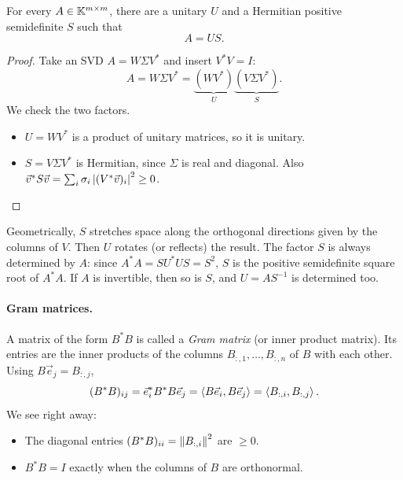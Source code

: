\begin{theorem}
  \label{thm:polar}
  For every $A \in \mathbb{K}^{m \times m}$, there are a unitary $U$ and a Hermitian positive semidefinite $S$ such that
  \begin{equation}
    A = US.
  \end{equation}
\end{theorem}

\begin{proof}
  Take an SVD $A = W\Sigma V^\ast$ and insert $V^\ast V = I$:
  \begin{equation}
    A = W\Sigma V^\ast = \underbrace{(WV^\ast)}_{U}\underbrace{(V\Sigma V^\ast)}_{S}.
  \end{equation}
  We check the two factors.
  \begin{itemize}
    \item $U = WV^\ast$ is a product of unitary matrices, so it is unitary.
    \item $S = V\Sigma V^\ast$ is Hermitian, since $\Sigma$ is real and diagonal. Also $\vec{v}^\ast S\vec{v} = \sum_i\sigma_i\left\lvert (V^\ast\vec{v})_i \right\rvert^2 \ge 0$. \qedhere
  \end{itemize}
\end{proof}

Geometrically, $S$ stretches space along the orthogonal directions given by the columns of $V$. Then $U$ rotates (or reflects) the result. The factor $S$ is always determined by $A$: since $A^\ast A = SU^\ast US = S^2$, $S$ is the positive semidefinite square root of $A^\ast A$. If $A$ is invertible, then so is $S$, and $U = AS^{-1}$ is determined too.

\paragraph{Gram matrices.} A matrix of the form $B^\ast B$ is called a \emph{Gram matrix} (or inner product matrix). Its entries are the inner products of the columns $B_{:,1}, \dots, B_{:,n}$ of $B$ with each other. Using $B\vec{e}_j = B_{:,j}$,
\begin{equation}
  (B^\ast B)_{ij} = \vec{e}_i^\ast B^\ast B\vec{e}_j = \left\langle B\vec{e}_i, B\vec{e}_j \right\rangle = \left\langle B_{:,i}, B_{:,j} \right\rangle.
\end{equation}
We see right away:
\begin{itemize}
  \item The diagonal entries $(B^\ast B)_{ii} = \left\lVert B_{:,i} \right\rVert^2$ are $\ge 0$.
  \item $B^\ast B = I$ exactly when the columns of $B$ are orthonormal.
\end{itemize}

